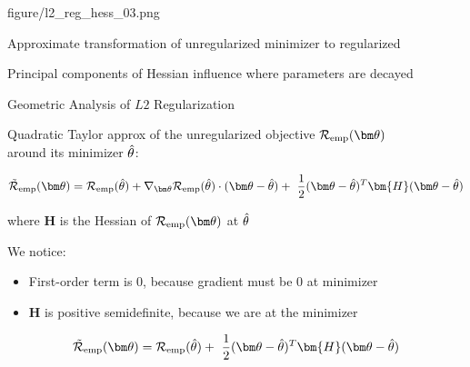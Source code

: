 \documentclass[11pt,compress,t,notes=noshow, xcolor=table]{beamer}
\begin{document}
{figure/l2_reg_hess_03.png} {
  \item Approximate transformation of unregularized minimizer to regularized 
  \item Principal components of Hessian influence where parameters are decayed  
}

\begin{vbframe}{Geometric Analysis of $L2$ Regularization}

Quadratic Taylor approx of the unregularized objective $\risket$ \\
around its minimizer $\hat{\theta}$:

$$ \mathcal{\tilde R}_{\text{emp}}(\thetav)= \mathcal{R}_{\text{emp}}(\thetah) + \nabla_{\thetav} \mathcal{R}_{\text{emp}}(\thetah)\cdot(\thetav - \thetah) + \ \frac{1}{2} (\thetav - \thetah)^T \bm{H} (\thetav - \thetah) $$

where $\bm{H}$ is the Hessian of $\risket$ at $\hat{\theta}$

\lz \lz 

We notice:

\begin{itemize}
  \item First-order term is 0, because gradient must be $0$ at minimizer
  \item $\bm{H}$ is positive semidefinite, because we are at the minimizer
\end{itemize}


$$ \mathcal{\tilde R}_{\text{emp}}(\thetav)= \mathcal{R}_{\text{emp}}(\thetah) + \ \frac{1}{2} (\thetav - \thetah)^T \bm{H} (\thetav - \thetah) $$


\lz

\end{vbframe}
\end{document}

